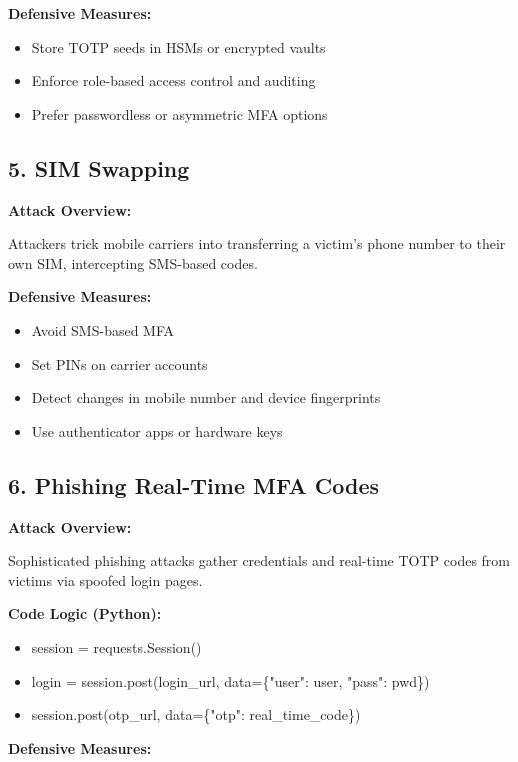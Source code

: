 \textbf{Defensive Measures:}

\begin{itemize}
    \item Store TOTP seeds in HSMs or encrypted vaults
    \item Enforce role-based access control and auditing
    \item Prefer passwordless or asymmetric MFA options
\end{itemize}

\subsection{\textbf{5. SIM Swapping}}

\textbf{Attack Overview:}

Attackers trick mobile carriers into transferring a victim's phone number to their own SIM, intercepting SMS-based codes.

\textbf{Defensive Measures:}

\begin{itemize}
    \item Avoid SMS-based MFA
    \item Set PINs on carrier accounts
    \item Detect changes in mobile number and device fingerprints
    \item Use authenticator apps or hardware keys

\end{itemize}

\subsection{\textbf{6. Phishing Real-Time MFA Codes}}

\textbf{Attack Overview:}

Sophisticated phishing attacks gather credentials and real-time TOTP codes from victims via spoofed login pages.

\textbf{Code Logic (Python):}

\begin{itemize}
    \item session = requests.Session()
    \item login = session.post(login\_url, data=\{"user": user, "pass": pwd\})
    \item session.post(otp\_url, data=\{"otp": real\_time\_code\})
\end{itemize}

\textbf{Defensive Measures:}

